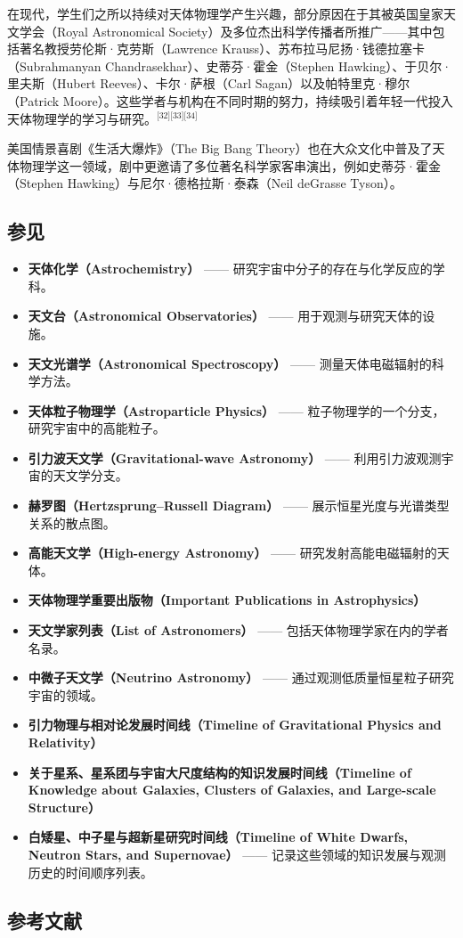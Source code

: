 在现代，学生们之所以持续对天体物理学产生兴趣，部分原因在于其被英国皇家天文学会（Royal Astronomical Society）及多位杰出科学传播者所推广——其中包括著名教授劳伦斯·克劳斯（Lawrence Krauss）、苏布拉马尼扬·钱德拉塞卡（Subrahmanyan Chandrasekhar）、史蒂芬·霍金（Stephen Hawking）、于贝尔·里夫斯（Hubert Reeves）、卡尔·萨根（Carl Sagan）以及帕特里克·穆尔（Patrick Moore）。这些学者与机构在不同时期的努力，持续吸引着年轻一代投入天体物理学的学习与研究。\(^\text{[32][33][34]}\)

美国情景喜剧《生活大爆炸》（The Big Bang Theory）也在大众文化中普及了天体物理学这一领域，剧中更邀请了多位著名科学家客串演出，例如史蒂芬·霍金（Stephen Hawking）与尼尔·德格拉斯·泰森（Neil deGrasse Tyson）。
\subsection{参见}
\begin{itemize}
  \item \textbf{天体化学（Astrochemistry）} —— 研究宇宙中分子的存在与化学反应的学科。
  \item \textbf{天文台（Astronomical Observatories）} —— 用于观测与研究天体的设施。
  \item \textbf{天文光谱学（Astronomical Spectroscopy）} —— 测量天体电磁辐射的科学方法。
  \item \textbf{天体粒子物理学（Astroparticle Physics）} —— 粒子物理学的一个分支，研究宇宙中的高能粒子。
  \item \textbf{引力波天文学（Gravitational-wave Astronomy）} —— 利用引力波观测宇宙的天文学分支。
  \item \textbf{赫罗图（Hertzsprung–Russell Diagram）} —— 展示恒星光度与光谱类型关系的散点图。
  \item \textbf{高能天文学（High-energy Astronomy）} —— 研究发射高能电磁辐射的天体。
  \item \textbf{天体物理学重要出版物（Important Publications in Astrophysics）}
  \item \textbf{天文学家列表（List of Astronomers）} —— 包括天体物理学家在内的学者名录。
  \item \textbf{中微子天文学（Neutrino Astronomy）} —— 通过观测低质量恒星粒子研究宇宙的领域。
  \item \textbf{引力物理与相对论发展时间线（Timeline of Gravitational Physics and Relativity）}
  \item \textbf{关于星系、星系团与宇宙大尺度结构的知识发展时间线（Timeline of Knowledge about Galaxies, Clusters of Galaxies, and Large-scale Structure）}
  \item \textbf{白矮星、中子星与超新星研究时间线（Timeline of White Dwarfs, Neutron Stars, and Supernovae）} —— 记录这些领域的知识发展与观测历史的时间顺序列表。
\end{itemize}
\subsection{参考文献}
